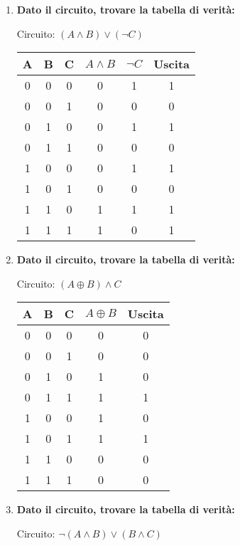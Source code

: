 \documentclass[12pt,a4paper]{article}
\begin{document}
\begin{enumerate}
    \item \textbf{Dato il circuito, trovare la tabella di verità:}
    
    Circuito: $(A \land B) \lor (\lnot C)$
    
    \begin{center}
    \begin{tabular}{|c|c|c||c|c|c|}
    \hline
    A & B & C & $A \land B$ & $\lnot C$ & Uscita \\
    \hline
    0 & 0 & 0 & 0 & 1 & 1 \\
    0 & 0 & 1 & 0 & 0 & 0 \\
    0 & 1 & 0 & 0 & 1 & 1 \\
    0 & 1 & 1 & 0 & 0 & 0 \\
    1 & 0 & 0 & 0 & 1 & 1 \\
    1 & 0 & 1 & 0 & 0 & 0 \\
    1 & 1 & 0 & 1 & 1 & 1 \\
    1 & 1 & 1 & 1 & 0 & 1 \\
    \hline
    \end{tabular}
    \end{center}

    \item \textbf{Dato il circuito, trovare la tabella di verità:}
    
    Circuito: $(A \oplus B) \land C$
    
    \begin{center}
    \begin{tabular}{|c|c|c||c|c|}
    \hline
    A & B & C & $A \oplus B$ & Uscita \\
    \hline
    0 & 0 & 0 & 0 & 0 \\
    0 & 0 & 1 & 0 & 0 \\
    0 & 1 & 0 & 1 & 0 \\
    0 & 1 & 1 & 1 & 1 \\
    1 & 0 & 0 & 1 & 0 \\
    1 & 0 & 1 & 1 & 1 \\
    1 & 1 & 0 & 0 & 0 \\
    1 & 1 & 1 & 0 & 0 \\
    \hline
    \end{tabular}
    \end{center}

    \item \textbf{Dato il circuito, trovare la tabella di verità:}
    
    Circuito: $\lnot(A \land B) \lor (B \land C)$
    

\end{enumerate}
\end{document}
